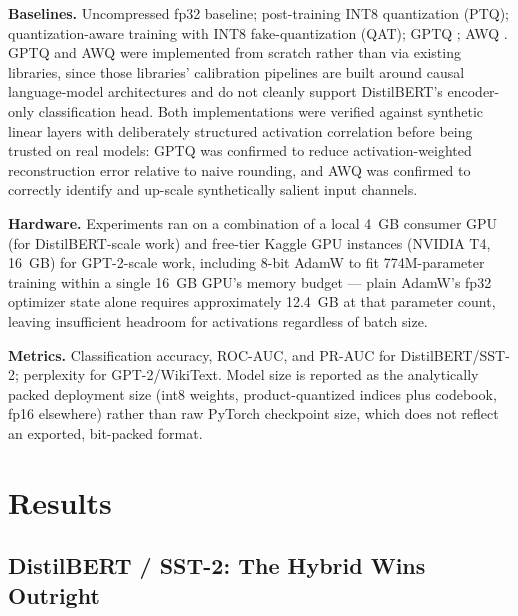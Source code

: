 \documentclass[11pt]{article}
\begin{document}
\textbf{Baselines.} Uncompressed fp32 baseline; post-training INT8
quantization (PTQ); quantization-aware training with INT8 fake-quantization
(QAT); GPTQ \citep{frantar2023gptq}; AWQ \citep{lin2024awq}. GPTQ and AWQ
were implemented from scratch rather than via existing libraries, since
those libraries' calibration pipelines are built around causal
language-model architectures and do not cleanly support DistilBERT's
encoder-only classification head. Both implementations were verified
against synthetic linear layers with deliberately structured
activation correlation before being trusted on real models: GPTQ was
confirmed to reduce activation-weighted reconstruction error relative to
naive rounding, and AWQ was confirmed to correctly identify and up-scale
synthetically salient input channels.

\textbf{Hardware.} Experiments ran on a combination of a local 4~GB
consumer GPU (for DistilBERT-scale work) and free-tier Kaggle GPU
instances (NVIDIA T4, 16~GB) for GPT-2-scale work, including 8-bit AdamW
\citep{dettmers2022bit8} to fit 774M-parameter training within a single
16~GB GPU's memory budget --- plain AdamW's fp32 optimizer state alone
requires approximately 12.4~GB at that parameter count, leaving
insufficient headroom for activations regardless of batch size.

\textbf{Metrics.} Classification accuracy, ROC-AUC, and PR-AUC for
DistilBERT/SST-2; perplexity for GPT-2/WikiText. Model size is reported as
the analytically packed deployment size (int8 weights, product-quantized
indices plus codebook, fp16 elsewhere) rather than raw PyTorch checkpoint
size, which does not reflect an exported, bit-packed format.

\section{Results}

\subsection{DistilBERT / SST-2: The Hybrid Wins Outright}
\end{document}

